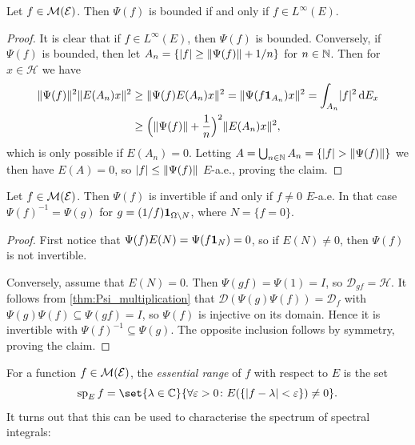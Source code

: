 \documentclass[article, a4paper, 11pt, oneside]{memoir}
\makeatletter
\numberwithin{equation}{chapter}
\newcommand{\calH}{\mathcal{H}}
\newcommand{\calE}{\mathcal{E}}
\newcommand{\dom}{\mathcal{D}}
\theoremstyle{myexample}
\theoremstyle{myexample}
\theoremstyle{myexamplebreak}
\theoremstyle{myexamplebreak}
\theoremstyle{nonumberplain}
\newtheorem{proof}{\protect\@proof}
\theoremstyle{MyNonumberplain}
\newcommand{\@proof}{}
\renewcommand{\@proof}{Proof}%
\renewcommand{\@proof}{Bevis}%
\makeatother
\begin{document}
\begin{proposition}
    \label{thm:bounded_spectral_integral}
    Let $f \in \measurable(\calE)$. Then $\Psi(f)$ is bounded if and only if $f \in L^\infty(E)$.
\end{proposition}

\begin{proof}
    It is clear that if $f \in L^\infty(E)$, then $\Psi(f)$ is bounded. Conversely, if $\Psi(f)$ is bounded, then let $A_n = \{ \lvert f\rvert \geq \lVert\Psi(f)\rVert + 1/n \}$ for $n \in \mathbb{N}$. Then for $x \in \calH$ we have
    \begin{align*}
        \lVert\Psi(f)\rVert^2 \lVert E(A_n)x\rVert^2
            &\geq \lVert\Psi(f) E(A_n)x\rVert^2
             = \lVert\Psi(f \mathbf{1}_{A_n})x\rVert^2
             = \int_{A_n} \lvert f\rvert^2 \mathop{}\!\mathrm{d} E_x \\
            &\geq \Big( \lVert\Psi(f)\rVert + \frac{1}{n} \Big)^2 \lVert E(A_n)x\rVert^2,
    \end{align*}
    which is only possible if $E(A_n) = 0$. Letting $A = \bigunion_{n \in \setN} A_n = \{ \abs{f} > \norm{\Psi(f)} \}$ we then have $E(A) = 0$, so $\lvert f\rvert \leq \lVert\Psi(f)\rVert$ $E$-a.e., proving the claim.
\end{proof}


\begin{proposition}
    Let $f \in \measurable(\calE)$. Then $\Psi(f)$ is invertible if and only if $f \neq 0$ $E$-a.e. In that case $\Psi(f)^{-1} = \Psi(g)$ for $g = (1/f)\mathbf{1}_{\Omega \setminus N}$, where $N = \{ f = 0 \}$.
\end{proposition}

\begin{proof}
    First notice that $\Psi(f) E(N) = \Psi(f \mathbf{1}_{N}) = 0$, so if $E(N) \neq 0$, then $\Psi(f)$ is not invertible.
    
    Conversely, assume that $E(N) = 0$. Then $\Psi(gf) = \Psi(1) = I$, so $\dom_{gf} = \calH$. It follows from \cref{thm:Psi_multiplication} that $\dom(\Psi(g) \Psi(f)) = \dom_f$ with $\Psi(g) \Psi(f) \subseteq \Psi(gf) = I$, so $\Psi(f)$ is injective on its domain. Hence it is invertible with $\Psi(f)^{-1} \subseteq \Psi(g)$. The opposite inclusion follows by symmetry, proving the claim.
\end{proof}


\newcommand{\essran}{\operatorname{sp}}

For a function $f \in \measurable(\calE)$, the \emph{essential range}  of $f$ with respect to $E$ is the set
%
\begin{equation*}
    \essran_E f = \set{\lambda \in \setC}{\forall \epsilon > 0\colon E(\{ \abs{f - \lambda} < \epsilon \}) \neq 0}.
\end{equation*}
%
It turns out that this can be used to characterise the spectrum of spectral integrals:
\end{document}
